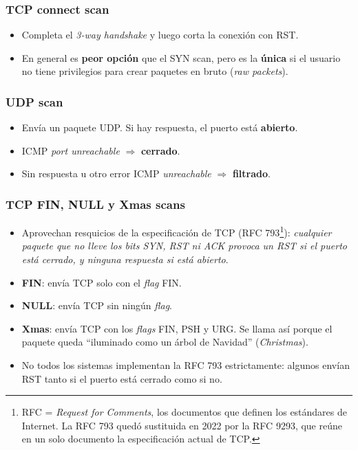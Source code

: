 \documentclass[11pt,a4paper]{report}
\begin{document}
\subsubsection*{TCP connect scan}
\begin{itemize}
  \item Completa el \emph{3-way handshake} y luego corta la conexión con RST.
  \item En general es \textbf{peor opción} que el SYN scan, pero es la \textbf{única} si el usuario no tiene privilegios para crear paquetes en bruto (\emph{raw packets}).
\end{itemize}
 
\subsubsection*{UDP scan}
\begin{itemize}
  \item Envía un paquete UDP. Si hay respuesta, el puerto está \textbf{abierto}.
  \item ICMP \emph{port unreachable} $\Rightarrow$ \textbf{cerrado}.
  \item Sin respuesta u otro error ICMP \emph{unreachable} $\Rightarrow$ \textbf{filtrado}.
\end{itemize}
 
\subsubsection*{TCP FIN, NULL y Xmas scans}
\begin{itemize}
  \item Aprovechan resquicios de la especificación de TCP (RFC 793\footnote{RFC = \emph{Request for Comments}, los documentos que definen los estándares de Internet. La RFC 793 quedó sustituida en 2022 por la RFC 9293, que reúne en un solo documento la especificación actual de TCP.}): \emph{cualquier paquete que no lleve los bits SYN, RST ni ACK provoca un RST si el puerto está cerrado, y ninguna respuesta si está abierto}.
  \item \textbf{FIN}: envía TCP solo con el \emph{flag} FIN.
  \item \textbf{NULL}: envía TCP sin ningún \emph{flag}.
  \item \textbf{Xmas}: envía TCP con los \emph{flags} FIN, PSH y URG. Se llama así porque el paquete queda ``iluminado como un árbol de Navidad'' (\emph{Christmas}).
  \item No todos los sistemas implementan la RFC 793 estrictamente: algunos envían RST tanto si el puerto está cerrado como si no.
\end{itemize}
 
\end{document}
